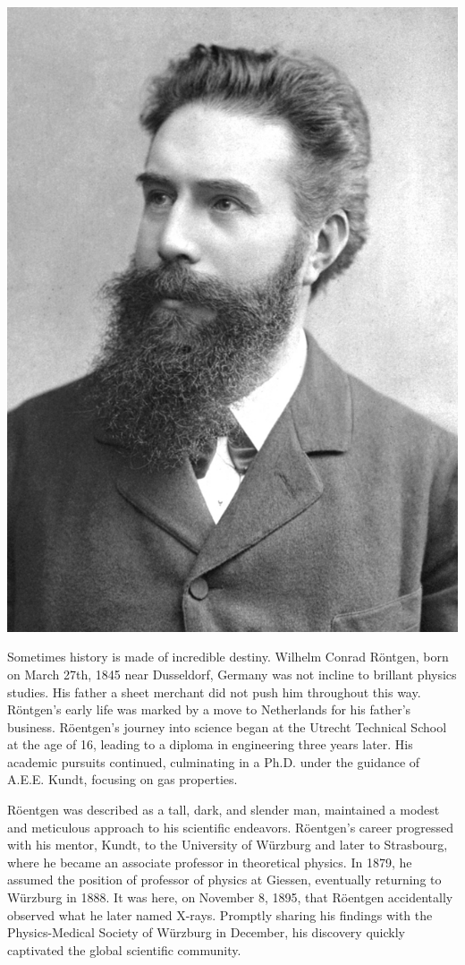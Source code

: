 \documentclass[a4paper,12pt]{report}
\begin{document}
\begin{center}
  \includegraphics[scale=0.3]{roentgen.png}
  \label{fig=Röntgen}
\end{center}

Sometimes history is made of incredible destiny. Wilhelm Conrad Röntgen, born on March
27th, 1845 near Dusseldorf, Germany was not incline to brillant physics studies. His father a
sheet merchant did not push him throughout this way. Röntgen's early life was marked by a
move to Netherlands for his father's business. Röentgen's journey into science began at the
Utrecht Technical School at the age of 16, leading to a diploma in engineering three years later.
His academic pursuits continued, culminating in a Ph.D. under the guidance of A.E.E. Kundt,
focusing on gas properties.

Röentgen was described as a tall, dark, and slender man, maintained a modest and meticulous
approach to his scientific endeavors. Röentgen's career progressed with his mentor, Kundt, to the
University of Würzburg and later to Strasbourg, where he became an associate professor in
theoretical physics. In 1879, he assumed the position of professor of physics at Giessen,
eventually returning to Würzburg in 1888. It was here, on November 8, 1895, that Röentgen
accidentally observed what he later named X-rays. Promptly sharing his findings with the
Physics-Medical Society of Würzburg in December, his discovery quickly captivated the global
scientific community.
\end{document}

